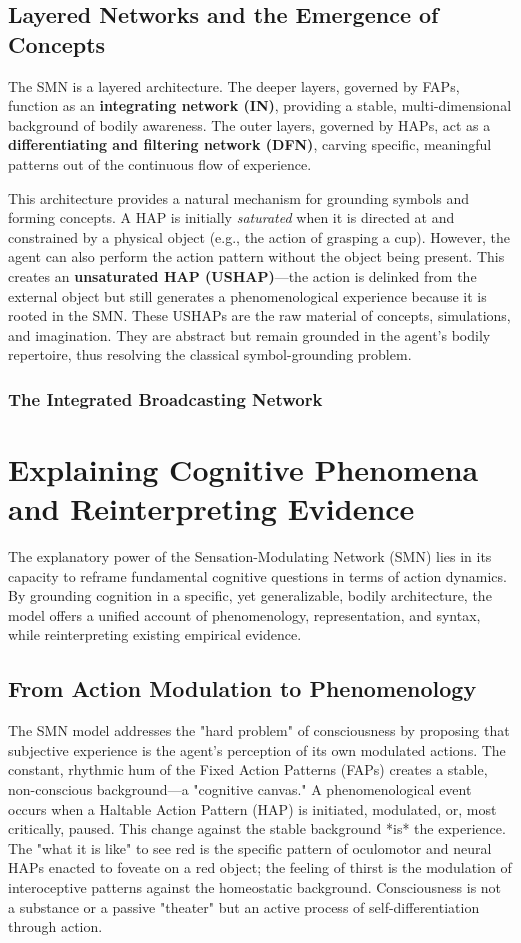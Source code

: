 \documentclass[10pt,letterpaper]{article}
\begin{document}
\subsection*{Layered Networks and the Emergence of Concepts}
The SMN is a layered architecture. The deeper layers, governed by FAPs, function as an \textbf{integrating network (IN)}, providing a stable, multi-dimensional background of bodily awareness. The outer layers, governed by HAPs, act as a \textbf{differentiating and filtering network (DFN)}, carving specific, meaningful patterns out of the continuous flow of experience.

This architecture provides a natural mechanism for grounding symbols and forming concepts. A HAP is initially \textit{saturated} when it is directed at and constrained by a physical object (e.g., the action of grasping a cup). However, the agent can also perform the action pattern without the object being present. This creates an \textbf{unsaturated HAP (USHAP)}—the action is delinked from the external object but still generates a phenomenological experience because it is rooted in the SMN. These USHAPs are the raw material of concepts, simulations, and imagination. They are abstract but remain grounded in the agent's bodily repertoire, thus resolving the classical symbol-grounding problem.

\subsubsection*{The Integrated Broadcasting Network}

\section{Explaining Cognitive Phenomena and Reinterpreting Evidence}
The explanatory power of the Sensation-Modulating Network (SMN) lies in its capacity to reframe fundamental cognitive questions in terms of action dynamics. By grounding cognition in a specific, yet generalizable, bodily architecture, the model offers a unified account of phenomenology, representation, and syntax, while reinterpreting existing empirical evidence.

\subsection*{From Action Modulation to Phenomenology}
The SMN model addresses the "hard problem" of consciousness by proposing that subjective experience is the agent's perception of its own modulated actions. The constant, rhythmic hum of the Fixed Action Patterns (FAPs) creates a stable, non-conscious background—a "cognitive canvas." A phenomenological event occurs when a Haltable Action Pattern (HAP) is initiated, modulated, or, most critically, paused. This change against the stable background *is* the experience. The "what it is like" to see red is the specific pattern of oculomotor and neural HAPs enacted to foveate on a red object; the feeling of thirst is the modulation of interoceptive patterns against the homeostatic background. Consciousness is not a substance or a passive "theater" but an active process of self-differentiation through action.
\end{document}

